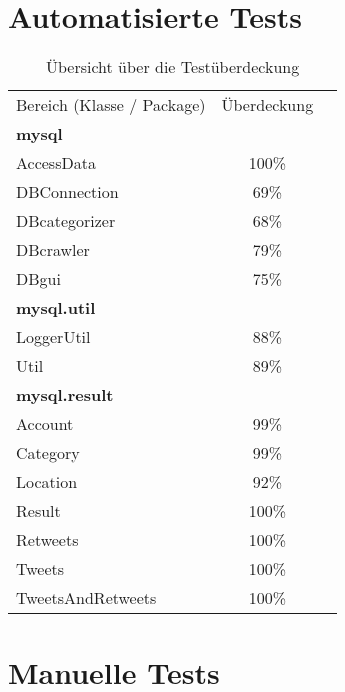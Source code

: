 \section{Automatisierte Tests}

\begin{table}[h]
\begin{tabular} {lcr}
Bereich (Klasse / Package) & Überdeckung \\
	\textbf{mysql} &  \\
		\hspace*{3mm}AccessData & 100\% \\
		\hspace*{3mm}DBConnection & 69\% \\
		\hspace*{3mm}DBcategorizer & 68\% \\
		\hspace*{3mm}DBcrawler & 79\% \\
		\hspace*{3mm}DBgui & 75\% \\
	\textbf{mysql.util} &  \\
		\hspace*{3mm}LoggerUtil & 88\% \\
		\hspace*{3mm}Util & 89\% \\
	\textbf{mysql.result} &  \\
		\hspace*{3mm}Account & 99\% \\
		\hspace*{3mm}Category & 99\% \\
		\hspace*{3mm}Location & 92\% \\
		\hspace*{3mm}Result & 100\% \\
		\hspace*{3mm}Retweets & 100\% \\
		\hspace*{3mm}Tweets & 100\% \\
		\hspace*{3mm}TweetsAndRetweets & 100\% \\
	\end{tabular}
	\caption{Übersicht über die Testüberdeckung}
\end{table}

\section{Manuelle Tests}

